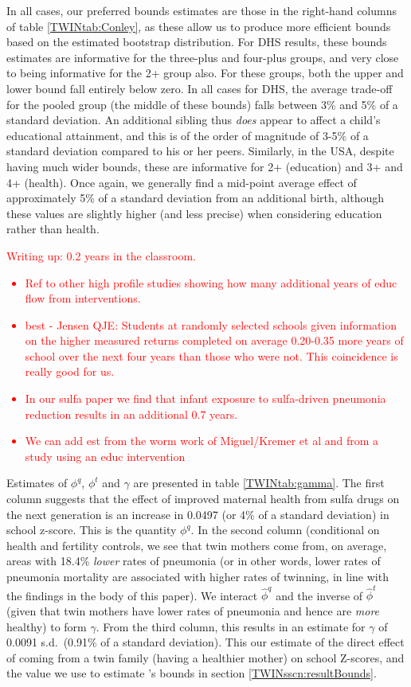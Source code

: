 \documentclass[subeqn]{article}
\begin{document}
\begin{spacing}{1.4}
In all cases, our preferred bounds estimates are those in the right-hand
columns of table \ref{TWINtab:Conley}, as these allow us to produce more
efficient bounds based on the estimated bootstrap distribution.  For DHS
results, these bounds estimates are informative for the three-plus and 
four-plus groups, and very close to being informative for the 2+ group also.  
For these groups, both the upper and lower bound fall entirely below zero. In
all cases for DHS, the average trade-off for the pooled group (the middle of
these bounds) falls between 3\% and 5\% of a standard deviation.  An additional
sibling thus \emph{does} appear to affect a child's educational attainment,
and this is of the order of magnitude of 3-5\% of a standard deviation compared
to his or her peers.  Similarly, in the USA, despite having much wider bounds,
these are informative for 2+ (education) and 3+ and 4+ (health).  Once again,
we generally find a mid-point average effect of approximately 5\% of a 
standard deviation from an additional birth, although these values are slightly
higher (and less precise) when considering education rather than health.
 
\textcolor{red}{ Writing up: 0.2 years in the classroom.
\begin{itemize}
\item Ref to other high profile studies showing how many additional years of 
educ flow from interventions.
\item  best - Jensen QJE: Students at randomly selected schools given 
information on the higher measured returns completed on average 0.20-0.35 more 
years of school over the next four years than those who were not. This 
coincidence is really good for us.
\item In our sulfa paper we find that infant exposure to sulfa-driven pneumonia 
reduction results in an additional 0.7 years.
\item We can add est from the worm work of Miguel/Kremer et al and from a study 
using an educ intervention
\end{itemize}
}

Estimates of $\phi^q$, $\phi^t$ and $\gamma$ are presented in table
\ref{TWINtab:gamma}.  The first column suggests that the effect of improved
maternal health from sulfa drugs on the next generation is an increase
in 0.0497 (or 4\% of a standard deviation) in school z-score.  This is the
quantity $\phi^q$.  In the second column (conditional on health and fertility
controls, we see that twin mothers come from, on average, areas with 18.4\%
\emph{lower} rates of pneumonia (or in other words, lower rates of pneumonia
mortality are associated with higher rates of twinning, in line with the
findings in the body of this paper).  We interact $\hat\phi^q$ and the inverse
of $\hat\phi^t$ (given that twin mothers have lower rates of pneumonia and
hence are \emph{more} healthy) to form $\gamma$.  From the third column, this
results in an estimate for $\gamma$ of 0.0091 s.d.\ (0.91\% of a standard
deviation).  This our estimate of the direct effect of coming from a twin
family (having a healthier mother) on school Z-scores, and the value we use
to estimate \citet{Conleyetal2012}'s bounds in section
\ref{TWINsscn:resultBounds}.


\end{spacing}
\end{document}
